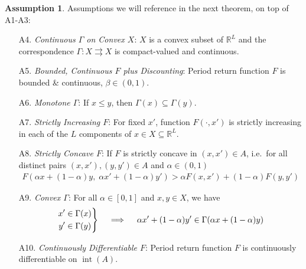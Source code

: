 \documentclass[12pt]{book}
\numberwithin{equation}{section} %
\theoremstyle{plain}
\newtheorem{prop}[thm]{Proposition}
\theoremstyle{definition}
\newtheorem{assump}[thm]{Assumption}
\theoremstyle{remark}
\newcommand{\R}{\mathbb{R}}
\newenvironment{rcases}
  {\left.\begin{aligned}}
  {\end{aligned}\right\rbrace}
\newcommand{\interior}{\operatorname{int}}
\begin{document}

\begin{assump}
Assumptions we will reference in the next theorem, on top of A1-A3:
\begin{enumerate}
  \item[A4.]
    \emph{Continuous $\Gamma$ on Convex $X$}:
    $X$ is a convex subset of $\R^L$ and the correspondence
    $\Gamma:X\rightrightarrows X$ is compact-valued and continuous.

  \item[A5.]
    \emph{Bounded, Continuous $F$ plus Discounting}:
    Period return function $F$ is bounded \& continuous,
    $\beta\in (0,1)$.

  \item[A6.]
    \emph{Monotone $\Gamma$}:
    If $x \leq y$, then $\Gamma(x) \subseteq \Gamma(y)$.

  \item[A7.]
    \emph{Strictly Increasing $F$}:
    For fixed $x'$, function $F(\cdot,x')$ is strictly increasing in
    each of the $L$ components of $x\in X\subseteq \R^L$.

  \item[A8.]
    \emph{Strictly Concave $F$}:
    If $F$ is strictly concave in $(x,x')\in A$, i.e.\ for all distinct
    pairs $(x,x'), (y,y') \in A$ and $\alpha \in (0,1)$
    \begin{align*}
      F\left(\alpha x + (1-\alpha)y, \; \alpha x' + (1-\alpha)y'\right)
      >
      \alpha F(x,x') + (1-\alpha)F(y,y')
    \end{align*}

  \item[A9.]
    \emph{Convex $\Gamma$}:
    For all $\alpha\in[0,1]$ and $x,y\in X$, we have
    \begin{align*}
      \begin{rcases}
        x'&\in \Gamma(x) \\
        y'&\in \Gamma(y)
      \end{rcases}
      \quad\implies\quad
      \alpha x' + (1-\alpha) y'
      \in \Gamma(\alpha x + (1-\alpha) y)
    \end{align*}

  \item[A10.]
    \emph{Continuously Differentiable $F$}:
    Period return function $F$ is continuously differentiable on
    $\interior(A)$.
\end{enumerate}
\end{assump}
\end{document}
